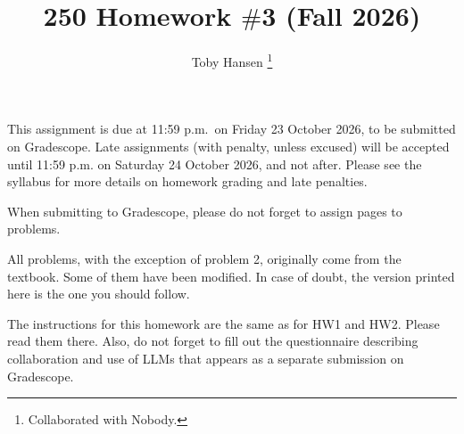 \documentclass[12pt]{article}
\title{250 Homework $\#$3 (Fall 2026)}
\author{Toby Hansen \footnote{Collaborated with Nobody.}}
\begin{document}
	\date{}
	\maketitle

	This assignment is due at 11:59 p.m.~on Friday 23 October 2026, to be
	submitted on Gradescope. Late assignments (with penalty, unless excused) will
	be accepted until 11:59 p.m. on Saturday 24 October 2026, and not after. Please
	see the syllabus for more details on homework grading and late penalties.

	\medskip

	When submitting to Gradescope, please do not forget to assign pages to problems.

	\medskip

	All problems, with the exception of problem 2, originally come from the
	textbook. Some of them have been modified. In case of doubt, the version printed
	here is the one you should follow.

	\bigskip

	The instructions for this homework are the same as for HW1 and HW2. Please read
	them there. Also, do not forget to fill out the questionnaire describing collaboration
	and use of LLMs that appears as a separate submission on Gradescope.


\end{document}
